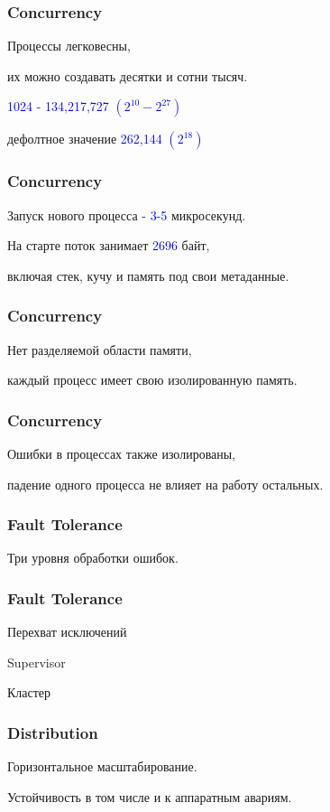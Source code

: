 \documentclass[10pt]{beamer}
\begin{document}
\begin{frame}
\frametitle{Concurrency}
\centering
Процессы легковесны,
\par
их можно создавать десятки и сотни тысяч.
\par \bigskip
\textcolor{blue}{1024 - 134,217,727 \begin{math}(2^{10} - 2^{27})\end{math}}
\par \bigskip
дефолтное значение \textcolor{blue}{262,144 \begin{math}(2^{18})\end{math}}
\end{frame}

\begin{frame}
\frametitle{Concurrency}
\centering
Запуск нового процесса - \textcolor{blue}{3-5} микросекунд.
\par \bigskip
На старте поток занимает \textcolor{blue}{2696} байт,
\par
включая стек, кучу и память под свои метаданные.
\end{frame}

\begin{frame}
\frametitle{Concurrency}
\centering
Нет разделяемой области памяти,
\par \bigskip
каждый процесс имеет свою изолированную память.
\end{frame}

\begin{frame}
\frametitle{Concurrency}
\centering
Ошибки в процессах также изолированы,
\par \bigskip
падение одного процесса не влияет на работу остальных.
\end{frame}

\begin{frame}
\frametitle{Fault Tolerance}
\centering
Три уровня обработки ошибок.
\end{frame}

\begin{frame}
\frametitle{Fault Tolerance}
\centering
Перехват исключений
\par \bigskip
Supervisor
\par \bigskip
Кластер
\end{frame}

\begin{frame}
\frametitle{Distribution}
\centering
Горизонтальное масштабирование.
\par \bigskip
Устойчивость в том числе и к аппаратным авариям.
\end{frame}
\end{document}
